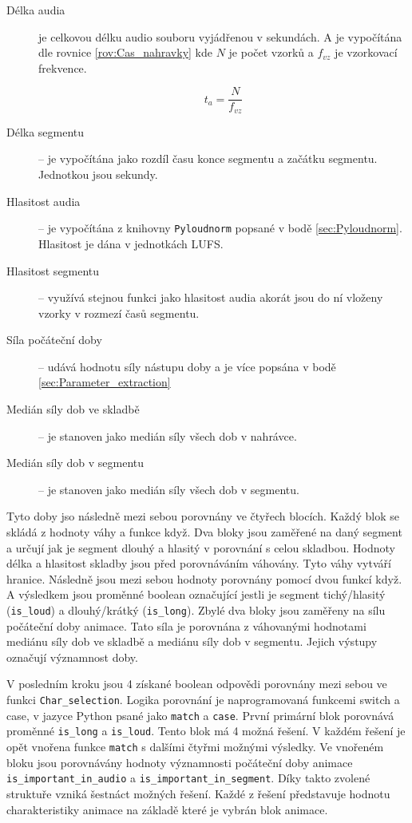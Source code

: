 \begin{description}
    \item[Délka audia] je celkovou délku audio souboru vyjádřenou v sekundách. A je vypočítána dle rovnice \ref{rov:Cas_nahravky} kde $N$ je počet vzorků a $f_{vz}$ je vzorkovací frekvence. 

    \begin{equation}
        t_{a} = \frac{N}{f_{vz}}
        \label{rov:Cas_nahravky}
    \end{equation}

    \item[Délka segmentu] -- je vypočítána jako rozdíl času konce segmentu a začátku segmentu. Jednotkou jsou sekundy. 
    \item[Hlasitost audia] -- je vypočítána z knihovny \texttt{Pyloudnorm} popsané v bodě \ref{sec:Pyloudnorm}. Hlasitost je dána v jednotkách LUFS.
    \item[Hlasitost segmentu] -- využívá stejnou funkci jako hlasitost audia akorát jsou do ní vloženy vzorky v rozmezí časů segmentu. 
    \item[Síla počáteční doby] -- udává hodnotu síly nástupu doby a je více popsána v bodě \ref{sec:Parameter_extraction}
    \item[Medián síly dob ve skladbě] -- je stanoven jako medián síly všech dob v nahrávce. 
    \item[Medián síly dob v segmentu] -- je stanoven jako medián  síly všech dob v segmentu. 
\end{description}
Tyto doby jso následně mezi sebou porovnány ve čtyřech blocích. Každý blok se skládá z hodnoty váhy a funkce když. Dva bloky jsou zaměřené na daný segment a určují jak je segment dlouhý a hlasitý v porovnání s celou skladbou. Hodnoty délka a hlasitost skladby jsou před porovnáváním váhovány. Tyto váhy vytváří hranice. Následně jsou mezi sebou hodnoty porovnány pomocí dvou funkcí když. A výsledkem jsou proměnné boolean označující jestli je segment tichý/hlasitý (\texttt{is\_loud}) a dlouhý/krátký (\texttt{is\_long}). Zbylé dva bloky jsou zaměřeny na sílu počáteční doby animace. Tato síla je porovnána z váhovanými hodnotami mediánu síly dob ve skladbě a mediánu síly dob v segmentu. Jejich výstupy označují významnost doby. 

V posledním kroku jsou 4 získané boolean odpovědi porovnány mezi sebou ve funkci \texttt{Char\_selection}. Logika porovnání je naprogramovaná funkcemi switch a case, v jazyce Python psané jako \texttt{match} a \texttt{case}. První primární blok porovnává proměnné \texttt{is\_long} a \texttt{is\_loud}. Tento blok má 4 možná řešení. V každém řešení je opět vnořena funkce \texttt{match} s dalšími čtyřmi možnými výsledky. Ve vnořeném bloku jsou porovnávány hodnoty významnosti počáteční doby animace \texttt{is\_important\_in\_audio} a \texttt{is\_important\_in\_segment}. Díky takto zvolené struktuře vzniká šestnáct možných řešení. Každé z řešení představuje hodnotu charakteristiky animace na základě které je vybrán blok animace. 

